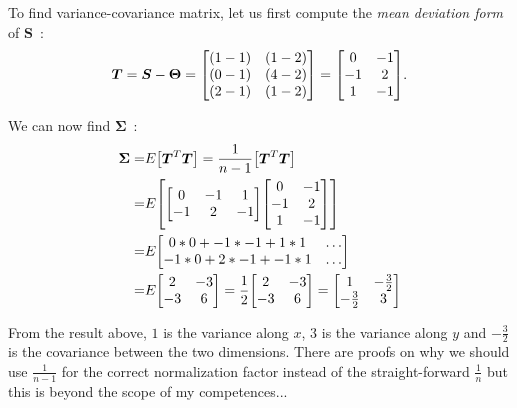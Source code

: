 \documentclass[11pt,twocolumn]{amsart} %
\newcommand{\ma}[1]{\boldsymbol{#1}}
\newenvironment{m}{\begin{bmatrix}}{\end{bmatrix}}
\begin{document}
To find variance-covariance matrix, let us first compute the \emph{mean deviation form} of $\ma{S}$~:
\[
  \ma{T} = \ma{S} - \ma\Theta = \begin{m} (1-1) & (1-2) \\ (0-1) & (4-2) \\ (2-1) & (1-2)\end{m} = \begin{m} 0 & -1 \\ -1 & 2 \\ 1 & -1\end{m}.
\]

We can now find $\ma\Sigma$~:
\begin{align*}
  \ma\Sigma = & E \begin{m} \ma{T}^T\ma{T}\end{m} = \frac{1}{n-1} \begin{m} \ma{T}^T\ma{T}\end{m} \\
         = & E \begin{m} \begin{m} 0 & -1 & 1 \\ -1 & 2 & -1\end{m} \begin{m} 0 & -1 \\ -1 & 2 \\ 1 & -1\end{m} \end{m} \\
         = & E \begin{m} 0*0 + -1*-1 + 1*1 & \hdots \\ -1*0 + 2*-1 + -1*1 & \hdots \end{m} \\
         = & E \begin{m} 2 & -3 \\ -3 & 6 \end{m} = \frac{1}{2} \begin{m} 2 & -3 \\ -3 & 6 \end{m}
         = \begin{m} 1 & -\frac{3}{2} \\ -\frac{3}{2} & 3\end{m}
\end{align*}

From the result above, $1$ is the variance along $x$, $3$ is the variance along $y$ and $-\frac{3}{2}$ is the covariance between the two dimensions. There are proofs on why we should use $\frac{1}{n-1}$ for the correct normalization factor instead of the straight-forward $\frac{1}{n}$ but this is beyond the scope of my competences...
\end{document}
